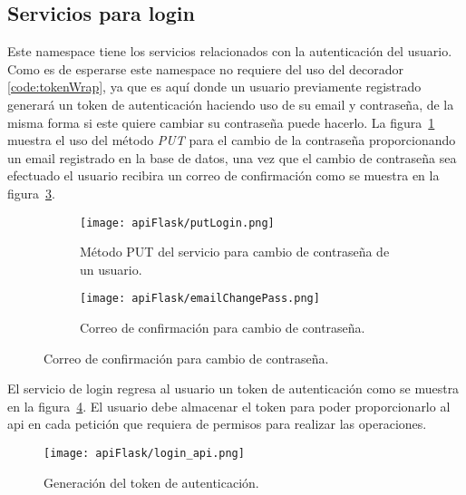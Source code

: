 \subsection{Servicios para login}

Este namespace tiene los servicios relacionados con la autenticación del usuario. Como es de esperarse este namespace no requiere del uso del decorador \ref{code:tokenWrap}, ya que es aquí donde un usuario previamente registrado generará un token de autenticación haciendo uso de su email y contraseña, de la misma forma si este quiere cambiar su contraseña puede hacerlo. La figura~\ref{img:putLogin} muestra el uso del método \textit{PUT} para el cambio de la contraseña proporcionando un email registrado en la base de datos, una vez que el cambio de contraseña sea efectuado el usuario recibira un correo de confirmación como se muestra en la figura~\ref{img:changePass}.

\begin{figure}[H]
  \begin{subfigure}[b]{0.5\textwidth}
      \texttt{[image: apiFlask/putLogin.png]}
      \caption{Método PUT del servicio para cambio de contraseña de un usuario.}
      \label{img:putLogin}
    \end{subfigure}
    \hfill
    \begin{subfigure}[b]{0.5\textwidth}
      \texttt{[image: apiFlask/emailChangePass.png]}
      \caption{Correo de confirmación para cambio de contraseña.}
      \label{img:changePass}
    \end{subfigure}
\end{figure}

El servicio de login regresa al usuario un token de autenticación como se muestra en la figura~\ref{img:loginApi}. El usuario debe almacenar el token para poder proporcionarlo al api en cada petición que requiera de permisos para realizar las operaciones.


\begin{figure}[H]
  \centering
  \texttt{[image: apiFlask/login\_api.png]}
  \caption{Generación del token de autenticación.}
  \label{img:loginApi}
\end{figure}